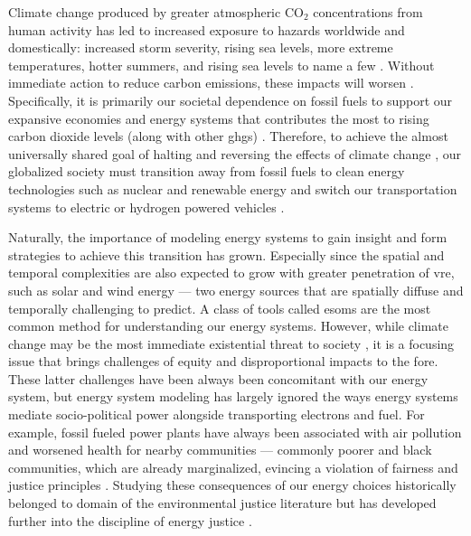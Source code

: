 Climate change produced by greater atmospheric CO$_2$ concentrations
\cite{kane_atmospheric_1996} from human activity has led to increased exposure
to hazards worldwide and domestically: increased storm severity, rising sea
levels, more extreme temperatures, hotter summers, and rising sea levels to name
a few \cite{reidmiller_fourth_2018}. Without immediate action to reduce carbon
emissions, these impacts will worsen
\cite{intergovernmental_panel_on_climate_change_climate_2014}. Specifically, it
is primarily our societal dependence on fossil fuels to support our expansive
economies and energy systems that contributes the most to rising carbon dioxide
levels (along with other \acp{ghg}) \cite{epa_inventory_2023}. Therefore, to
achieve the almost universally shared goal of halting and reversing the effects
of climate change \cite{united_nations_paris_2015}, our globalized society must
transition away from fossil fuels to clean energy technologies such as nuclear
and renewable energy and switch our transportation systems to electric or
hydrogen powered vehicles
\cite{intergovernmental_panel_on_climate_change_climate_2021}. 

Naturally, the importance of modeling energy systems to gain insight and form
strategies to achieve this transition has grown. Especially since the spatial
and temporal complexities are also expected to grow with greater penetration of
\ac{vre}, such as solar and wind energy --- two energy sources that are
spatially diffuse and temporally challenging to predict. A class of tools called
\acp{esom} are the most common method for understanding our energy systems.
However, while climate change may be the most immediate existential threat to
society \cite{hickman_climate_2021}, it is a focusing issue that brings
challenges of equity and disproportional impacts to the fore. These latter
challenges have been always been concomitant with our energy system, but energy
system modeling has largely ignored the ways energy systems mediate
socio-political power alongside transporting electrons and fuel. For example,
fossil fueled power plants have always been associated with air pollution and
worsened health for nearby communities --- commonly poorer and black
communities, which are already marginalized, evincing a violation of fairness
and justice principles \cite{mohai_which_2015}. Studying these consequences of
our energy choices historically belonged to domain of the environmental justice
literature \cite{schlosberg_reconceiving_2004,mohai_environmental_2009} but has
developed further into the discipline of energy justice
\cite{sovacool_energy_2015}. 

